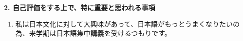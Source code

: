 \documentclass[11pt,a4paper,twoside]{jarticle}
\newcommand{\研究課題名}{Symmetry breaking operators}
\newcommand{\研究機関名}{東京大学}
\newcommand{\申請者氏名}{レオンチエフ\,オレクシィ}
\newcommand{\研究代表者氏名}{\申請者氏名}
\newcommand{\研究期間の最終元号年度}{31}	%
\begin{document}
{\vspace{5mm}
{\bf 2. 自己評価をする上で、特に重要と思われる事項}
\begin{enumerate}
	\item 私は日本文化に対して大興味があって、日本語がもっとうまくなりたいの為、来学期は日本語集中講義を受けるつもりです。
\end{enumerate}
}





\end{document}

